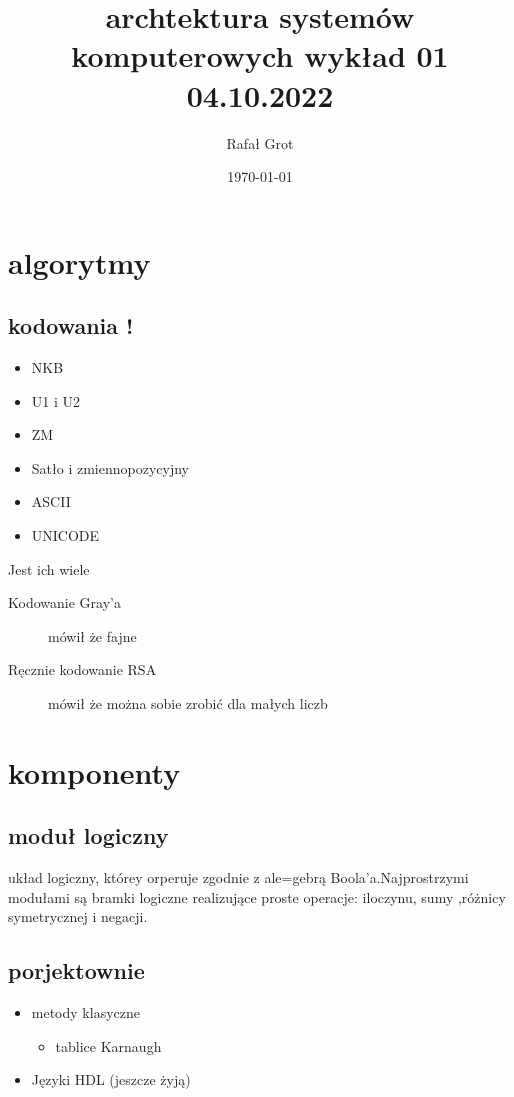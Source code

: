 \documentclass[11pt]{article}
\author{Rafał Grot}
\date{\today}
\title{archtektura systemów komputerowych wykład 01 04.10.2022}
\begin{document}
\maketitle
\tableofcontents

\section{algorytmy}
\label{sec:org693c737}
\subsection{kodowania !}
\label{sec:org49ea8a8}
\begin{itemize}
\item NKB
\item U1 i U2
\item ZM
\item Satło i zmiennopozycyjny
\item ASCII
\item UNICODE
\end{itemize}
Jest ich wiele
\begin{description}
\item[{Kodowanie Gray'a}] mówił że fajne
\item[{Ręcznie kodowanie RSA}] mówił że można sobie zrobić dla małych liczb
\end{description}
\section{komponenty}
\label{sec:org0aad6dc}
\subsection{moduł logiczny}
\label{sec:org4187692}
układ logiczny, którey orperuje zgodnie z ale=gebrą Boola'a.Najprostrzymi modułami są bramki logiczne realizujące proste operacje: iloczynu, sumy ,różnicy symetrycznej i negacji.
\subsection{porjektownie}
\label{sec:org3e44460}
\begin{itemize}
\item metody klasyczne
\begin{itemize}
\item tablice Karnaugh
\end{itemize}
\item Języki HDL
(jeszcze żyją)
\end{itemize}
\end{document}
